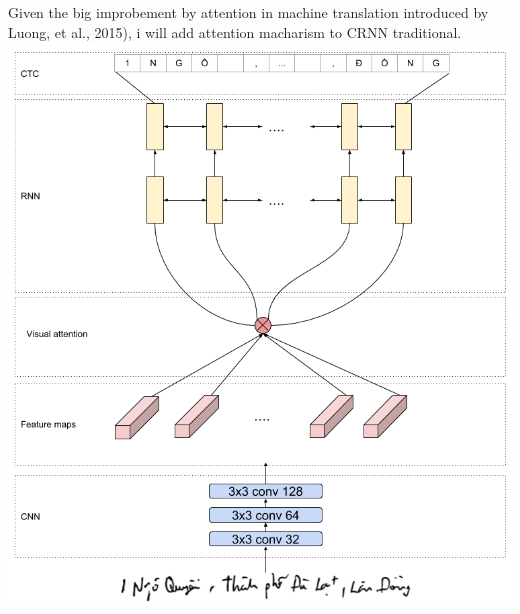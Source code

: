 \documentclass[14pt]{extarticle}
\newcommand{\<}{\langle}
\renewcommand{\>}{\rangle}
\theoremstyle{definition}
\begin{document}
Given the big improbement by attention in machine translation introduced by Luong, et al., 2015)\cite{attention}, i will add attention macharism to CRNN traditional. 
\includegraphics[width=170mm,scale=0.7]{ocr_crnn.png}
\end{document}
